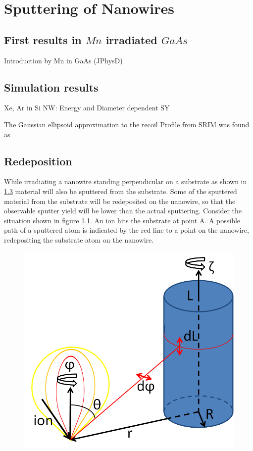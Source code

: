 \chapter{Sputtering of Nanowires}


\section{First results in $Mn$ irradiated $GaAs$}

Introduction by Mn in GaAs (JPhysD)


\section{Simulation results}
\label{sec:simsputering}


Xe, Ar in Si NW: Energy and Diameter dependent SY

The Gaussian ellipsoid approximation to the recoil Profile from SRIM was found as \cite{bobes_ion_2012}



\section{Redeposition}

While irradiating a nanowire standing perpendicular on a substrate as shown in \ref{} material will also be sputtered from the substrate. Some of the sputtered material from the substrate will be redeposited on the nanowire, so that the observable sputter yield will be lower than the actual sputtering. Consider the situation shown in figure \ref{redeposit}. An ion hits the substrate at point A. A possible path of a sputtered atom is indicated by the red line to a point on the nanowire, redepositing the substrate atom on the nanowire. 

\begin{figure}
	\centering
		\includegraphics[width=.48\textwidth]{images/redeposit.jpg}
	\caption{} 
	\label{redeposit}
\end{figure}

